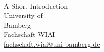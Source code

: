 \begin{titlepage}
\begin{center}
\vspace*{20mm}{\Huge \LaTeX}\\
\vspace{5mm} {\LARGE A Short Introduction}\\
\vspace{12mm} {\LARGE University of\\ Bamberg}\\
\vspace{24mm} {Fachschaft WIAI\\ \href{mailto: fachschaft.wiai@uni-bamberg.de}{fachschaft.wiai@uni-bamberg.de}}\\
\end{center}
\end{titlepage}